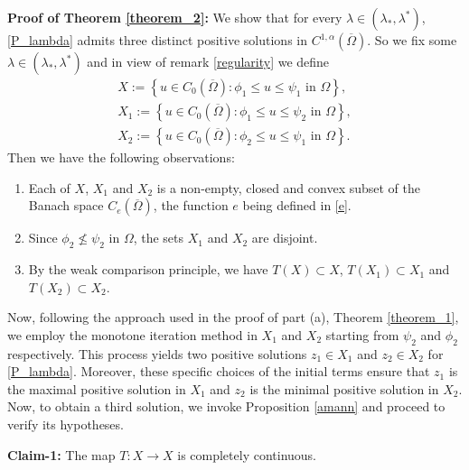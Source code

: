 \documentclass[reqno,oneside]{amsart}
\theoremstyle{definition}
\theoremstyle{remark}
\numberwithin{equation}{section}
\newcommand{\la} {\lambda}
\newcommand{\Om} {\Omega}
\newcommand{\rar}{\rightarrow}
\newcommand{\omc}{(\overline{\Om})}
\begin{document}
\noindent\textbf{Proof of Theorem \ref{theorem_2}:} We show that for every $\la\in (\la_* , \la^*)$, \eqref{P_lambda} admits three distinct positive solutions in $C^{1,\alpha} \omc$. So we fix some $\la\in (\la_* , \la^*)$ and in view of remark \ref{regularity} we define
\begin{equation*}
    \begin{aligned}
        X:= \left\{u\in C_0 \omc : \phi_1 \leq u \leq \psi_1 \text{ in } \Om \right\},\\
        X_1:= \left\{u\in C_0 \omc : \phi_1 \leq u \leq \psi_2 \text{ in } \Om \right\},\\
        X_2:= \left\{u\in C_0 \omc : \phi_2 \leq u \leq \psi_1 \text{ in } \Om \right\}.
    \end{aligned}
\end{equation*}
Then we have the following observations:
\begin{enumerate}
    \item Each of $X$, $X_1$ and $X_2$ is a non-empty, closed and convex subset of the Banach space $C_e \omc$, the function $e$ being defined in \eqref{e}.

    \item Since $\phi_2 \not\leq \psi_2$ in $\Om$, the sets $X_1$ and $X_2$ are disjoint.

    \item By the weak comparison principle, we have $T(X) \subset X$, $T(X_1) \subset X_1$ and $T(X_2) \subset X_2$.
\end{enumerate}
Now, following the approach used in the proof of part (a), Theorem \ref{theorem_1}, we employ the monotone iteration method in $X_1$ and $X_2$ starting from $\psi_2$ and $\phi_2$ respectively. This process yields two positive solutions $z_1 \in X_1$ and $z_2 \in X_2$ for \eqref{P_lambda}. Moreover, these specific choices of the initial terms ensure that $z_1$ is the maximal positive solution in $X_1$ and $z_2$ is the minimal positive solution in $X_2$. Now, to obtain a third solution, we invoke Proposition \ref{amann} and proceed to verify its hypotheses.

\noindent\textbf{Claim-1:} The map $T: X \rar X$ is completely continuous.
\end{document}
